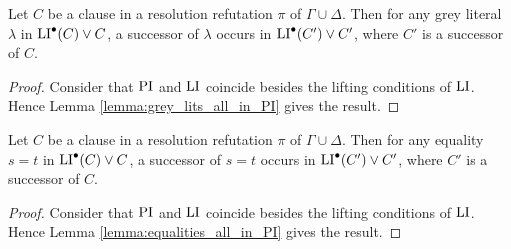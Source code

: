 \documentclass[,%
	draft=false,%
	numbers=noendperiod
	12pt,
	a4paper,
	oneside,%
	openany,
]{memoir}
\begin{document}
\begin{clemma}
	\label{lemma:grey_lits_all_in_LI}
	Let $C$ be a clause in a resolution refutation $\pi$ of $\Gamma \cup \Delta$.
	Then for any grey literal $\lambda$ in $\operatorname{LI}^\bullet(C) \lor C$, a successor of $\lambda$ occurs in $\operatorname{LI}^\bullet(C') \lor C'$, where $C'$ is a successor of $C$.
\end{clemma}
\begin{proof}
	Consider that $\operatorname{PI}$ and $\operatorname{LI}$ coincide besides the lifting conditions of $\operatorname{LI}$. Hence Lemma \ref{lemma:grey_lits_all_in_PI} gives the result.
\end{proof}

\begin{clemma}
	\label{lemma:equalities_all_in_LI}
	Let $C$ be a clause in a resolution refutation $\pi$ of $\Gamma \cup \Delta$.
	Then for any equality $s=t$ in $\operatorname{LI}^\bullet(C) \lor C$, a successor of $s=t$ occurs in $\operatorname{LI}^\bullet(C') \lor C'$, where $C'$ is a successor of $C$.
\end{clemma}
\begin{proof}
	Consider that $\operatorname{PI}$ and $\operatorname{LI}$ coincide besides the lifting conditions of $\operatorname{LI}$. Hence Lemma \ref{lemma:equalities_all_in_PI} gives the result.
\end{proof}
\end{document}
